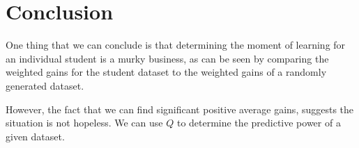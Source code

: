 \documentclass{acmlarge-edm}
\begin{document}
\section{Conclusion}

One thing that we can conclude is that determining the
moment of learning for an individual student is a murky
business, as can be seen by comparing the weighted gains for
the student dataset to the weighted gains of a 
randomly generated dataset.

However, the fact that we can find significant positive average gains,
suggests the situation is not hopeless.  We can use $Q$ to determine
the predictive power of a given dataset. 




\end{document}
